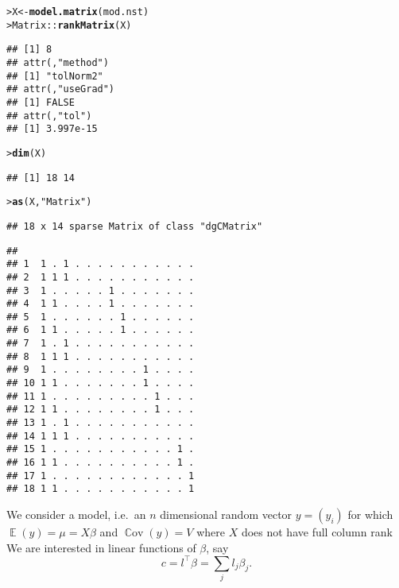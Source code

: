\documentclass[11pt]{article}\usepackage[]{graphicx}\usepackage[]{color}
\makeatletter
\newcommand{\hlstr}[1]{\textcolor[rgb]{0.192,0.494,0.8}{#1}}%
\newcommand{\hlopt}[1]{\textcolor[rgb]{0,0,0}{#1}}%
\newcommand{\hlstd}[1]{\textcolor[rgb]{0.345,0.345,0.345}{#1}}%
\newcommand{\hlkwb}[1]{\textcolor[rgb]{0.69,0.353,0.396}{#1}}%
\newcommand{\hlkwd}[1]{\textcolor[rgb]{0.737,0.353,0.396}{\textbf{#1}}}%
\newenvironment{kframe}{%
 \def\at@end@of@kframe{}%
 \ifinner\ifhmode%
  \def\at@end@of@kframe{\end{minipage}}%
  \begin{minipage}{\columnwidth}%
 \fi\fi%
 \def\FrameCommand##1{\hskip\@totalleftmargin \hskip-\fboxsep
 \colorbox{shadecolor}{##1}\hskip-\fboxsep
     \hskip-\linewidth \hskip-\@totalleftmargin \hskip\columnwidth}%
 \MakeFramed {\advance\hsize-\width
   \@totalleftmargin\z@ \linewidth\hsize
   \@setminipage}}%
 {\par\unskip\endMakeFramed%
 \at@end@of@kframe}
\newenvironment{knitrout}{}{} %
\renewenvironment{knitrout}{
  \begin{oldknitrout}
    \footnotesize
    \topsep=0pt
}{
  \end{oldknitrout}
}
\DeclareMathOperator{\EE}{\mathbb{E}}
\DeclareMathOperator{\cov}{\mathbb{C}ov}
\newcommand{\transp}{^{\top}}
\makeatother
\begin{document}
\begin{knitrout}
\color{fgcolor}\begin{kframe}
\begin{alltt}
\hlstd{> }\hlstd{X} \hlkwb{<-} \hlkwd{model.matrix}\hlstd{( mod.nst )}
\hlstd{> }\hlstd{Matrix}\hlopt{::}\hlkwd{rankMatrix}\hlstd{(X)}
\end{alltt}
\begin{verbatim}
## [1] 8
## attr(,"method")
## [1] "tolNorm2"
## attr(,"useGrad")
## [1] FALSE
## attr(,"tol")
## [1] 3.997e-15
\end{verbatim}
\begin{alltt}
\hlstd{> }\hlkwd{dim}\hlstd{(X)}
\end{alltt}
\begin{verbatim}
## [1] 18 14
\end{verbatim}
\begin{alltt}
\hlstd{> }\hlkwd{as}\hlstd{(X,} \hlstr{"Matrix"}\hlstd{)}
\end{alltt}
\begin{verbatim}
## 18 x 14 sparse Matrix of class "dgCMatrix"
\end{verbatim}


{\ttfamily\noindent\itshape\color{messagecolor}{\#\# \ \ \ [[ suppressing 14 column names '(Intercept)', 'AA2', 'BB1:CC1' ... ]]}}\begin{verbatim}
##                               
## 1  1 . 1 . . . . . . . . . . .
## 2  1 1 1 . . . . . . . . . . .
## 3  1 . . . . . 1 . . . . . . .
## 4  1 1 . . . . 1 . . . . . . .
## 5  1 . . . . . . 1 . . . . . .
## 6  1 1 . . . . . 1 . . . . . .
## 7  1 . 1 . . . . . . . . . . .
## 8  1 1 1 . . . . . . . . . . .
## 9  1 . . . . . . . . 1 . . . .
## 10 1 1 . . . . . . . 1 . . . .
## 11 1 . . . . . . . . . 1 . . .
## 12 1 1 . . . . . . . . 1 . . .
## 13 1 . 1 . . . . . . . . . . .
## 14 1 1 1 . . . . . . . . . . .
## 15 1 . . . . . . . . . . . 1 .
## 16 1 1 . . . . . . . . . . 1 .
## 17 1 . . . . . . . . . . . . 1
## 18 1 1 . . . . . . . . . . . 1
\end{verbatim}
\end{kframe}
\end{knitrout}

We consider a  model, i.e.\
an $n$ dimensional random vector $y=(y_i)$ for which
$\EE(y)=\mu=X\beta$ and $\cov(y)=V$ where $X$ does not have
full column rank
We are
interested in linear functions of $\beta$, say
\begin{displaymath}
  c=l\transp\beta= \sum_j l_j \beta_j .
\end{displaymath}
\end{document}
